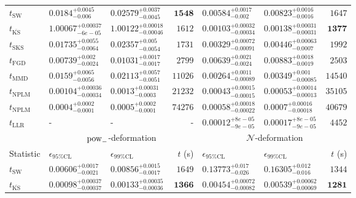 \begin{tabular}{l|llr|llr}
	\midrule
	$t_{\mathrm{SW}}$ & $0.0184_{-0.006}^{+0.0045}$ & $0.02579_{-0.0045}^{+0.0037}$ & ${\mathbf{1548}}$ & $0.00584_{-0.002}^{+0.0017}$ & $0.00823_{-0.0016}^{+0.0016}$ & $1647$ \\
	$t_{\overline{\mathrm{KS}}}$ & $1.00067_{-6e-05}^{+0.00037}$ & $1.00122_{-0.00046}^{+0.00018}$ & $1612$ & ${\mathbf{0.00103_{-0.00034}^{+0.00032}}}$ & ${\mathbf{0.00138_{-0.00031}^{+0.00031}}}$ & ${\mathbf{1377}}$ \\
	$t_{\mathrm{SKS}}$ & $0.01735_{-0.0064}^{+0.0055}$ & $0.02357_{-0.0054}^{+0.005}$ & $1731$ & $0.00329_{-0.00091}^{+0.00072}$ & $0.00446_{-0.0007}^{+0.00063}$ & $1992$ \\
	$t_{\mathrm{FGD}}$ & ${\mathbf{0.00739_{-0.0024}^{+0.002}}}$ & ${\mathbf{0.01031_{-0.0017}^{+0.0017}}}$ & $2799$ & $0.00639_{-0.0024}^{+0.0021}$ & $0.00883_{-0.0019}^{+0.0018}$ & $2503$ \\
	$t_{\mathrm{MMD}}$ & $0.0159_{-0.0056}^{+0.0065}$ & $0.02113_{-0.0051}^{+0.0057}$ & $11026$ & $0.00264_{-0.00089}^{+0.0011}$ & $0.00349_{-0.00085}^{+0.001}$ & $14540$ \\
\rowcolor{red!35}	$t_{\mathrm{NPLM}}$ & $0.00104_{-0.00034}^{+0.00036}$ & $0.0013_{-0.0003}^{+0.00031}$ & $21232$ & $0.00043_{-0.00015}^{+0.00015}$ & $0.00053_{-0.00013}^{+0.00014}$ & $35105$ \\
\rowcolor{blue!35}	$t_{\mathrm{NPLM}}$ & $0.0004_{-0.0001}^{+0.0002}$ & $0.0005_{-0.0001}^{+0.0002}$ & $74276$ & $0.00058_{-0.00022}^{+0.00018}$ & $0.0007_{-0.00018}^{+0.00016}$ & $40679$ \\
	$t_{\mathrm{LLR}}$ & - & - & - & $0.00012_{-9e-05}^{+8e-05}$ & $0.00017_{-9e-05}^{+8e-05}$ & $4452$ \\
	\toprule
	\multicolumn{1}{c}{} & \multicolumn{3}{c}{$\rm{pow}_{-}$-deformation} & \multicolumn{3}{c}{$\mathcal{N}$-deformation} \\
	Statistic & $\epsilon_{95\%\mathrm{CL}}$ & $\epsilon_{99\%\mathrm{CL}}$ & $t$ (s) & $\epsilon_{95\%\mathrm{CL}}$ & $\epsilon_{99\%\mathrm{CL}}$ & $t$ (s) \\
	\midrule
	$t_{\mathrm{SW}}$ & $0.00606_{-0.0021}^{+0.0017}$ & $0.00856_{-0.0017}^{+0.0015}$ & $1649$ & $0.13773_{-0.026}^{+0.017}$ & $0.16305_{-0.016}^{+0.012}$ & $1344$ \\
	$t_{\overline{\mathrm{KS}}}$ & ${\mathbf{0.00098_{-0.00037}^{+0.00037}}}$ & ${\mathbf{0.00133_{-0.00036}^{+0.00035}}}$ & ${\mathbf{1366}}$ & ${\mathbf{0.00454_{-0.00082}^{+0.00072}}}$ & ${\mathbf{0.00539_{-0.00069}^{+0.00062}}}$ & ${\mathbf{1281}}$ \\

\end{tabular}
